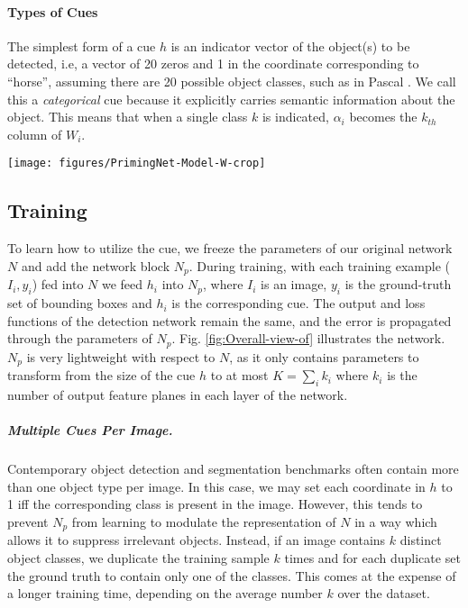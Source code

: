 \documentclass[10pt,letterpaper,twocolumn]{article}
\begin{document}
\paragraph{Types of Cues}

The simplest form of a cue $h$ is an indicator vector of the object(s)
to be detected, i.e, a vector of 20 zeros and 1 in the coordinate
corresponding to ``horse'', assuming there are 20 possible object
classes, such as in Pascal  \cite{everingham2010pascal}. We call
this a \emph{categorical }cue\textbf{ }because it explicitly carries
semantic information about the object. This means that when a single
class $k$ is indicated, $\alpha_{i}$ becomes the $k_{th}$ column
of $W_{i}$. 

\begin{figure*}
\texttt{[image: figures/PrimingNet-Model-W-crop]}

\caption{\label{fig:Overall-view-of}Overall view of the proposed method to
prime deep neural networks. A cue about some target in the image is
given by and external source or some form of feedback. The process
of priming involves affecting each layer of computation of the network
by modulating representations along the path. }
\end{figure*}

\subsection{Training}

To learn how to utilize the cue, we freeze the parameters of our original
network $N$ and add the network block $N_{p}$. During training,
with each training example ($I_{i},y_{i}$) fed into $N$ we feed
$h_{i}$ into $N_{p}$, where $I_{i}$ is an image, $y_{i}$ is the
ground-truth set of bounding boxes and $h_{i}$ is the corresponding
cue. The output and loss functions of the detection network remain
the same, and the error is propagated through the parameters of $N_{p}$.
Fig. \ref{fig:Overall-view-of} illustrates the network. $N_{p}$
is very lightweight with respect to $N$, as it only contains parameters
to transform from the size of the cue $h$ to at most $K=\sum_{i}k_{i}$
where $k_{i}$ is the number of output feature planes in each layer
of the network. 

\subparagraph{Multiple Cues Per Image.}

Contemporary object detection and segmentation benchmarks \cite{lin2014microsoft,everingham2010pascal}
often contain more than one object type per image. In this case, we
may set each coordinate in $h$ to 1 iff the corresponding class is
present in the image. However, this tends to prevent $N_{p}$ from
learning to modulate the representation of $N$ in a way which allows
it to suppress irrelevant objects. Instead, if an image contains $k$
distinct object classes, we duplicate the training sample $k$ times
and for each duplicate set the ground truth to contain only one of
the classes. This comes at the expense of a longer training time,
depending on the average number $k$ over the dataset. 
\end{document}
